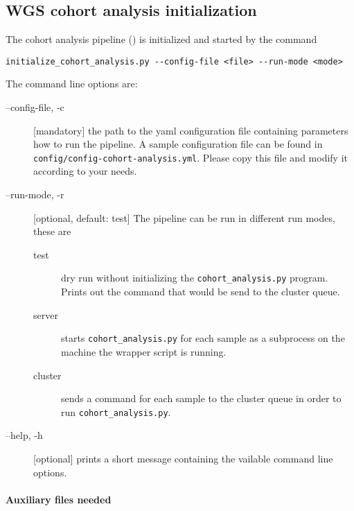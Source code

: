 \documentclass[a4paper]{article}
\begin{document}
\subsection{WGS cohort analysis initialization}
\label{sec:wgs-cohort-analysis-1}


The cohort analysis pipeline () is
initialized and started by the command

\begin{lstlisting}
initialize_cohort_analysis.py --config-file <file> --run-mode <mode>
\end{lstlisting}

The command line options are:

\begin{description}
\item[--config-file, -c] [mandatory] the path to the yaml
  configuration file containing parameters how to run the pipeline. A
  sample configuration file can be found in
  \texttt{config/config-cohort-analysis.yml}. Please copy this file
  and modify it according to your needs.
\item[--run-mode, -r] [optional, default: test] The pipeline can be
  run in different run modes, these are 

  \begin{description}
  \item[test] dry run without initializing the
    \texttt{cohort\_analysis.py} program. Prints out the command
    that would be send to the cluster queue.
  \item[server] starts \texttt{cohort\_analysis.py} for each
    sample as a subprocess on the machine the wrapper script is
    running.
  \item[cluster] sends a command for each sample to the cluster queue
    in order to run \texttt{cohort\_analysis.py}.
  \end{description}
    
\item[--help, -h] [optional] prints a short message containing the
  vailable command line options.
  
\end{description}


\paragraph{Auxiliary files needed}
\end{document}

